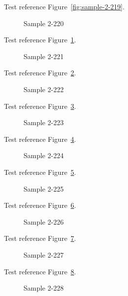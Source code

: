 Test reference Figure~\ref{fig:sample-2-219}.

\begin{figure}[tbhp]
\caption{Sample 2-220}
\label{fig:sample-2-220}
\end{figure}

Test reference Figure~\ref{fig:sample-2-220}.

\begin{figure}[tbhp]
\caption{Sample 2-221}
\label{fig:sample-2-221}
\end{figure}

Test reference Figure~\ref{fig:sample-2-221}.

\begin{figure}[tbhp]
\caption{Sample 2-222}
\label{fig:sample-2-222}
\end{figure}

Test reference Figure~\ref{fig:sample-2-222}.

\begin{figure}[tbhp]
\caption{Sample 2-223}
\label{fig:sample-2-223}
\end{figure}

Test reference Figure~\ref{fig:sample-2-223}.

\begin{figure}[tbhp]
\caption{Sample 2-224}
\label{fig:sample-2-224}
\end{figure}

Test reference Figure~\ref{fig:sample-2-224}.

\begin{figure}[tbhp]
\caption{Sample 2-225}
\label{fig:sample-2-225}
\end{figure}

Test reference Figure~\ref{fig:sample-2-225}.

\begin{figure}[tbhp]
\caption{Sample 2-226}
\label{fig:sample-2-226}
\end{figure}

Test reference Figure~\ref{fig:sample-2-226}.

\begin{figure}[tbhp]
\caption{Sample 2-227}
\label{fig:sample-2-227}
\end{figure}

Test reference Figure~\ref{fig:sample-2-227}.

\begin{figure}[tbhp]
\caption{Sample 2-228}
\label{fig:sample-2-228}
\end{figure}

